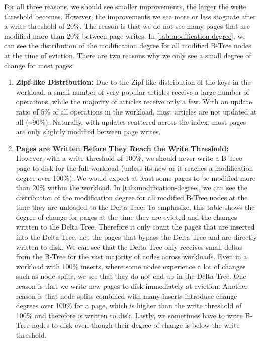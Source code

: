 For all three reasons, we should see smaller improvements, the larger the write threshold becomes.
However, the improvements we see more or less stagnate after a write threshold of 20\%.
The reason is that we do not see many pages that are modified more than 20\% between page writes.
In \autoref{tab:modification-degree}, we can see the distribution of the modification degree for all modified B-Tree nodes at the time of eviction.
There are two reasons why we only see a small degree of change for most pages:

\begin{enumerate}
\item \textbf{Zipf-like Distribution:}
Due to the Zipf-like distribution of the keys in the workload, a small number of very popular articles receive a large number of operations, while the majority of articles receive only a few.
With an update ratio of 5\% of all operations in the workload, most articles are not updated at all (\textasciitilde 90\%).
Naturally, with updates scattered across the index, most pages are only slightly modified between page writes.
\item \textbf{Pages are Written Before They Reach the Write Threshold:}
However, with a write threshold of 100\%, we should never write a B-Tree page to disk for the full workload (unless its new or it reaches a modification degree over 100\%).
We would expect at least some pages to be modified more than 20\% within the workload.
In \autoref{tab:modification-degree}, we can see the distribution of the modification degree for all modified B-Tree nodes at the time they are unloaded to the Delta Tree.
To emphasize, this table shows the degree of change for pages at the time they are evicted and the changes written to the Delta Tree. 
Therefore it only count the pages that are inserted into the Delta Tree, not the pages that bypass the Delta Tree and are directly written to disk.
We can see that the Delta Tree only receives small deltas from the B-Tree for the vast majority of nodes across workloads.
Even in a workload with 100\% inserts, where some nodes experience a lot of changes such as node splits, we see that they do not end up in the Delta Tree.
One reason is that we write new pages to disk immediately at eviction.
Another reason is that node splits combined with many inserts introduce change degrees over 100\% for a page, which is higher than the write threshold of 100\% and therefore is written to disk.
Lastly, we sometimes have to write B-Tree nodes to disk even though their degree of change is below the write threshold.

\end{enumerate}
